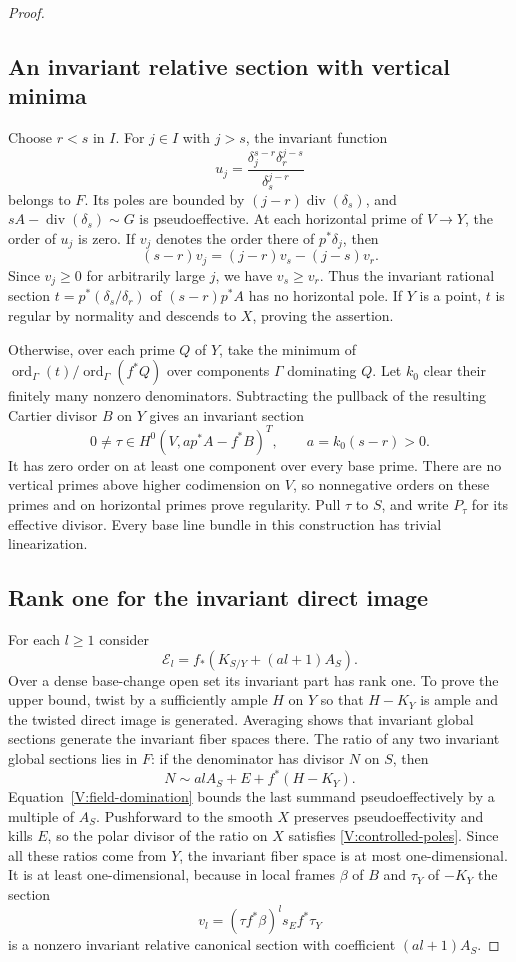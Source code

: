 \begin{proof}
\subsection*{An invariant relative section with vertical minima}

Choose $r<s$ in $I$.  For $j\in I$ with $j>s$, the invariant function
\[
 u_j=\frac{\delta_j^{s-r}\delta_r^{j-s}}
             {\delta_s^{j-r}}
\]
belongs to $F$.  Its poles are bounded by
$(j-r)\operatorname{div}(\delta_s)$, and
$sA-\operatorname{div}(\delta_s)\sim G$ is pseudoeffective.
At each horizontal prime of $V\to Y$, the order of $u_j$ is zero.
If $v_j$ denotes the order there of $p^*\delta_j$, then
\[
 (s-r)v_j=(j-r)v_s-(j-s)v_r.
\]
Since $v_j\ge0$ for arbitrarily large $j$, we have $v_s\ge v_r$.
Thus the invariant rational section
$t=p^*(\delta_s/\delta_r)$ of $(s-r)p^*A$ has no horizontal pole.
If $Y$ is a point, $t$ is regular by normality and descends to $X$,
proving the assertion.

Otherwise, over each prime $Q$ of $Y$, take the minimum of
$\operatorname{ord}_\Gamma(t)/\operatorname{ord}_\Gamma(f^*Q)$
over components $\Gamma$ dominating $Q$.  Let $k_0$ clear their
finitely many nonzero denominators.  Subtracting the pullback of the
resulting Cartier divisor $B$ on $Y$ gives an invariant section
\begin{equation}\label{V:relative-invariant}
 0\ne\tau\in H^0(V,a p^*A-f^*B)^T,
 \qquad a=k_0(s-r)>0.
\end{equation}
It has zero order on at least one component over every base prime.
There are no vertical primes above higher codimension on $V$, so
nonnegative orders on these primes and on horizontal primes prove
regularity.  Pull $\tau$ to $S$, and write $P_\tau$ for its effective
divisor.  Every base line bundle in this construction has trivial
linearization.

\subsection*{Rank one for the invariant direct image}

For each $l\ge1$ consider
\[
 \mathcal E_l=f_*(K_{S/Y}+(al+1)A_S).
\]
Over a dense base-change open set its invariant part has rank one.
To prove the upper bound, twist by a sufficiently ample $H$ on $Y$
so that $H-K_Y$ is ample and the twisted direct image is generated.
Averaging shows that invariant global sections generate the invariant
fiber spaces there.  The ratio of any two invariant global sections
lies in $F$: if the denominator has divisor $N$ on $S$, then
\[
 N\sim alA_S+E+f^*(H-K_Y).
\]
Equation~\eqref{V:field-domination} bounds the last summand
pseudoeffectively by a multiple of $A_S$.  Pushforward to the smooth
$X$ preserves pseudoeffectivity and kills $E$, so the polar divisor
of the ratio on $X$ satisfies \eqref{V:controlled-poles}.
Since all these ratios come from $Y$, the invariant fiber space is
at most one-dimensional.  It is at least one-dimensional, because
in local frames $\beta$ of $B$ and $\tau_Y$ of $-K_Y$ the section
\[
 v_l=(\tau f^*\beta)^l s_E f^*\tau_Y
\]
is a nonzero invariant relative canonical section with coefficient
$(al+1)A_S$.


\end{proof}

